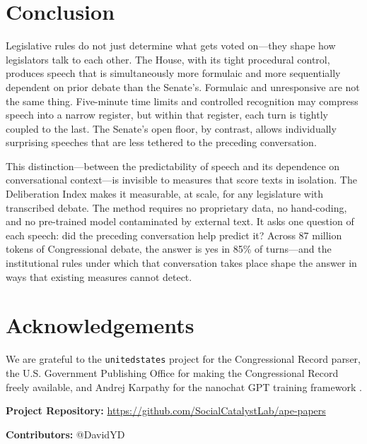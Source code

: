 \documentclass[12pt]{article}
\begin{document}
\section{Conclusion}

Legislative rules do not just determine what gets voted on---they shape how legislators talk to each other. The House, with its tight procedural control, produces speech that is simultaneously more formulaic and more sequentially dependent on prior debate than the Senate's. Formulaic and unresponsive are not the same thing. Five-minute time limits and controlled recognition may compress speech into a narrow register, but within that register, each turn is tightly coupled to the last. The Senate's open floor, by contrast, allows individually surprising speeches that are less tethered to the preceding conversation.

This distinction---between the predictability of speech and its dependence on conversational context---is invisible to measures that score texts in isolation. The Deliberation Index makes it measurable, at scale, for any legislature with transcribed debate. The method requires no proprietary data, no hand-coding, and no pre-trained model contaminated by external text. It asks one question of each speech: did the preceding conversation help predict it? Across 87 million tokens of Congressional debate, the answer is yes in 85\% of turns---and the institutional rules under which that conversation takes place shape the answer in ways that existing measures cannot detect.


\section*{Acknowledgements}

We are grateful to the \texttt{unitedstates} project for the Congressional Record parser, the U.S. Government Publishing Office for making the Congressional Record freely available, and Andrej Karpathy for the nanochat GPT training framework \citep{karpathy2025}.

\noindent\textbf{Project Repository:} \url{https://github.com/SocialCatalystLab/ape-papers}

\noindent\textbf{Contributors:} @DavidYD

\label{apep_main_text_end}
\newpage

\end{document}
